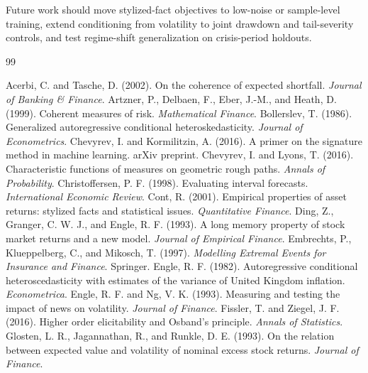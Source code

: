 \documentclass[letterpaper]{article}
\begin{document}
Future work should move stylized-fact objectives to low-noise or sample-level training, extend conditioning from volatility to joint drawdown and tail-severity controls, and test regime-shift generalization on crisis-period holdouts.

\begin{thebibliography}{99}

 Acerbi, C. and Tasche, D. (2002). On the coherence of expected shortfall. \emph{Journal of Banking \& Finance}.
 Artzner, P., Delbaen, F., Eber, J.-M., and Heath, D. (1999). Coherent measures of risk. \emph{Mathematical Finance}.
 Bollerslev, T. (1986). Generalized autoregressive conditional heteroskedasticity. \emph{Journal of Econometrics}.
 Chevyrev, I. and Kormilitzin, A. (2016). A primer on the signature method in machine learning. arXiv preprint.
 Chevyrev, I. and Lyons, T. (2016). Characteristic functions of measures on geometric rough paths. \emph{Annals of Probability}.
 Christoffersen, P. F. (1998). Evaluating interval forecasts. \emph{International Economic Review}.
 Cont, R. (2001). Empirical properties of asset returns: stylized facts and statistical issues. \emph{Quantitative Finance}.
 Ding, Z., Granger, C. W. J., and Engle, R. F. (1993). A long memory property of stock market returns and a new model. \emph{Journal of Empirical Finance}.
 Embrechts, P., Klueppelberg, C., and Mikosch, T. (1997). \emph{Modelling Extremal Events for Insurance and Finance}. Springer.
 Engle, R. F. (1982). Autoregressive conditional heteroscedasticity with estimates of the variance of United Kingdom inflation. \emph{Econometrica}.
 Engle, R. F. and Ng, V. K. (1993). Measuring and testing the impact of news on volatility. \emph{Journal of Finance}.
 Fissler, T. and Ziegel, J. F. (2016). Higher order elicitability and Osband's principle. \emph{Annals of Statistics}.
 Glosten, L. R., Jagannathan, R., and Runkle, D. E. (1993). On the relation between expected value and volatility of nominal excess stock returns. \emph{Journal of Finance}.

\end{thebibliography}
\end{document}
